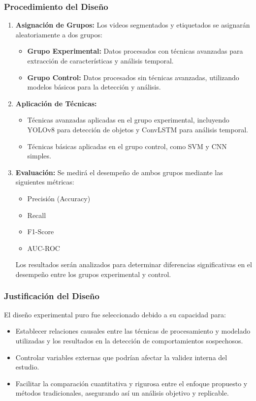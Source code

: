 \subsubsection{Procedimiento del Diseño}
\begin{enumerate}
    \item \textbf{Asignación de Grupos:} 
    Los videos segmentados y etiquetados se asignarán aleatoriamente a dos grupos:
    \begin{itemize}
        \item \textbf{Grupo Experimental:} Datos procesados con técnicas avanzadas para extracción de características y análisis temporal.
        \item \textbf{Grupo Control:} Datos procesados sin técnicas avanzadas, utilizando modelos básicos para la detección y análisis.
    \end{itemize}
    \item \textbf{Aplicación de Técnicas:}
    \begin{itemize}
        \item Técnicas avanzadas aplicadas en el grupo experimental, incluyendo YOLOv8 para detección de objetos y ConvLSTM para análisis temporal.
        \item Técnicas básicas aplicadas en el grupo control, como SVM y CNN simples.
    \end{itemize}
    \item \textbf{Evaluación:} 
    Se medirá el desempeño de ambos grupos mediante las siguientes métricas:
    \begin{itemize}
        \item Precisión (Accuracy)
        \item Recall
        \item F1-Score
        \item AUC-ROC
    \end{itemize}
    Los resultados serán analizados para determinar diferencias significativas en el desempeño entre los grupos experimental y control.
\end{enumerate}

\subsubsection{Justificación del Diseño}
El diseño experimental puro fue seleccionado debido a su capacidad para:
\begin{itemize}
    \item Establecer relaciones causales entre las técnicas de procesamiento y modelado utilizadas y los resultados en la detección de comportamientos sospechosos.
    \item Controlar variables externas que podrían afectar la validez interna del estudio.
    \item Facilitar la comparación cuantitativa y rigurosa entre el enfoque propuesto y métodos tradicionales, asegurando así un análisis objetivo y replicable.
\end{itemize}





